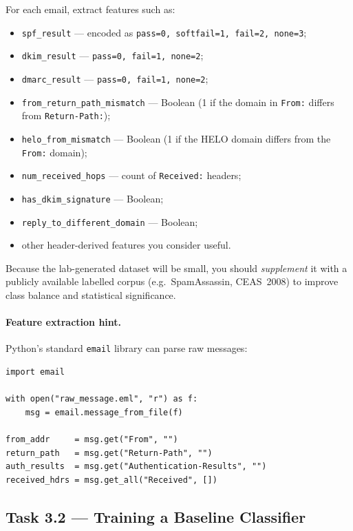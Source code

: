 \documentclass[11pt]{article}
\begin{document}
For each email, extract features such as:
\begin{itemize}[noitemsep]
  \item \texttt{spf\_result} --- encoded as
        \texttt{pass=0, softfail=1, fail=2, none=3};
  \item \texttt{dkim\_result} --- \texttt{pass=0, fail=1, none=2};
  \item \texttt{dmarc\_result} --- \texttt{pass=0, fail=1, none=2};
  \item \texttt{from\_return\_path\_mismatch} --- Boolean (1 if the
        domain in \texttt{From:} differs from \texttt{Return-Path:});
  \item \texttt{helo\_from\_mismatch} --- Boolean (1 if the HELO
        domain differs from the \texttt{From:} domain);
  \item \texttt{num\_received\_hops} --- count of \texttt{Received:}
        headers;
  \item \texttt{has\_dkim\_signature} --- Boolean;
  \item \texttt{reply\_to\_different\_domain} --- Boolean;
  \item other header-derived features you consider useful.
\end{itemize}

Because the lab-generated dataset will be small, you should
\emph{supplement} it with a publicly available labelled corpus (e.g.\
SpamAssassin, CEAS~2008) to improve class balance and statistical
significance.

\paragraph{Feature extraction hint.}
Python's standard \texttt{email} library can parse raw messages:

\begin{listing}[H]
\begin{verbatim}
import email

with open("raw_message.eml", "r") as f:
    msg = email.message_from_file(f)

from_addr     = msg.get("From", "")
return_path   = msg.get("Return-Path", "")
auth_results  = msg.get("Authentication-Results", "")
received_hdrs = msg.get_all("Received", [])
\end{verbatim}
\end{listing}

\subsection{Task 3.2 --- Training a Baseline Classifier}
\end{document}
